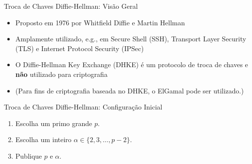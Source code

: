 \documentclass{beamer}
\begin{document}
\begin{frame}{Troca de Chaves Diffie-Hellman: Visão Geral}
    \begin{itemize}
        \item Proposto em 1976 por Whitfield Diffie e Martin Hellman
        \vspace{0.5em}
        \item Amplamente utilizado, e.g., em Secure Shell (SSH), Transport Layer Security (TLS) e Internet Protocol Security (IPSec)
        \vspace{0.5em}
        \item O Diffie-Hellman Key Exchange (DHKE) é um protocolo de troca de chaves e \textbf{não} utilizado para criptografia
        
        \item[] (Para fins de criptografia baseada no DHKE, o ElGamal pode ser utilizado.)
    \end{itemize}
\end{frame}

\begin{frame}{Troca de Chaves Diffie-Hellman: Configuração Inicial}
    \begin{enumerate}
        \item Escolha um primo grande $p$.
        \vspace{1em}
        \item Escolha um inteiro $\alpha \in \{2, 3, \ldots, p-2\}$.
        \vspace{1em}
        \item Publique $p$ e $\alpha$.
    \end{enumerate}
\end{frame}
\end{document}

